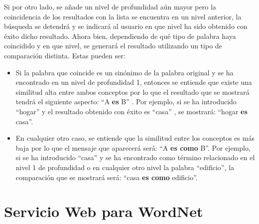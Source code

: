 Si por otro lado, se añade un nivel de profundidad aún mayor pero la coincidencia de los resultados con la lista se encuentra en un nivel anterior, la búsqueda se detendrá y se indicará al usuario en que nivel ha sido obtenido con éxito dicho resultado.
Ahora bien, dependiendo de qué tipo de palabra haya coincidido y en que nivel, se generará el resultado utilizando un tipo de comparación distinta. Estas pueden ser:
\begin{itemize}
	\item Si la palabra que coincide es un sinónimo de la palabra original  y se ha encontrado en un nivel de profundidad 1, entonces se entiende que existe una similitud alta entre ambos conceptos por lo que el resultado que se mostrará tendrá el siguiente aspecto: ``A \textbf{es} B'' . Por ejemplo, si se ha introducido ``hogar'' y el resultado obtenido con éxito es ``casa'' , se mostrará: ``hogar \textbf{es} casa''.
	
	\item En cualquier otro caso, se entiende que la similitud entre los conceptos es más baja por lo que el mensaje que aparecerá será:  ``A \textbf{es como} B''. Por ejemplo, si se ha introducido ``casa'' y se ha encontrado como término relacionado en el nivel 1 de profundidad o en cualquier otro nivel la palabra ``edificio'', la comparación que se mostrará será: ``casa \textbf{es como} edificio''.
\end{itemize}


\section{Servicio Web para WordNet}
\label{cap:sec:servicioWordnet}

